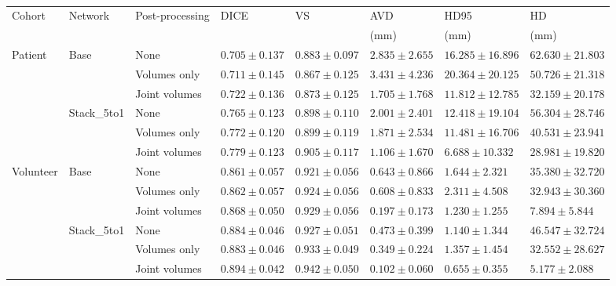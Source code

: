 \begin{sidewaystable}[htbp]
   \centering
   \caption[Detailed Results for Post-processing]{}
   \begin{tabular}{l*{7}{l}}
      \toprule
      Cohort	& Network	& Post-processing	& DICE				& VS				& AVD				& HD95				& HD				\\
      			&					&					&					&					& (mm)				& (mm)				& (mm)				\\
      \midrule
      Patient   & Base 	& None & $0.705 \pm 0.137$ & $\mathbf{0.883 \pm 0.097}$ & $2.835 \pm 2.655$ & $16.285 \pm 16.896$ & $62.630 \pm 21.803$ \\
                &                	& Volumes only  & $0.711 \pm 0.145$ & $0.867 \pm 0.125$ & $3.431 \pm 4.236$ & $20.364 \pm 20.125$ & $50.726 \pm 21.318$ \\
                &                	& Joint volumes & $\mathbf{0.722 \pm 0.136}$ & $0.873 \pm 0.125$ & $\mathbf{1.705 \pm 1.768}$ & $\mathbf{11.812 \pm 12.785}$& $\mathbf{32.159 \pm 20.178}$ \\
      \cmidrule{2-8}
                & Stack\_5to1 	& None & $0.765 \pm 0.123$ & $0.898 \pm 0.110$ & $2.001 \pm 2.401$ & $12.418 \pm 19.104$ & $56.304 \pm 28.746$ \\
                &                	& Volumes only  & $0.772 \pm 0.120$ & $0.899 \pm 0.119$ & $1.871 \pm 2.534$ & $11.481 \pm 16.706$ & $40.531 \pm 23.941$ \\
                &                	& Joint volumes      & $\mathbf{0.779 \pm 0.123}$ & $\mathbf{0.905 \pm 0.117}$ & $\mathbf{1.106 \pm 1.670}$ & $\mathbf{6.688  \pm 10.332}$ & $\mathbf{28.981 \pm 19.820}$ \\
      \midrule
      Volunteer & Base 	& None & $0.861 \pm 0.057$ & $0.921 \pm 0.056$ & $0.643 \pm 0.866$ & $1.644  \pm 2.321 $ & $35.380 \pm 32.720$ \\
                &                	& Volumes only  & $0.862 \pm 0.057$ & $0.924 \pm 0.056$ & $0.608 \pm 0.833$ & $2.311  \pm 4.508 $ & $32.943 \pm 30.360$ \\
                &                	& Joint volumes      & $\mathbf{0.868 \pm 0.050}$ & $\mathbf{0.929 \pm 0.056}$ & $\mathbf{0.197 \pm 0.173}$ & $\mathbf{1.230  \pm 1.255}$ & $\mathbf{7.894  \pm 5.844}$ \\
      \cmidrule{2-8}
                & Stack\_5to1 	& None & $0.884 \pm 0.046$ & $0.927 \pm 0.051$ & $0.473 \pm 0.399$ & $1.140  \pm 1.344 $ & $46.547 \pm 32.724$ \\
                &                	& Volumes only  & $0.883 \pm 0.046$ & $0.933 \pm 0.049$ & $0.349 \pm 0.224$ & $1.357  \pm 1.454 $ & $32.552 \pm 28.627$ \\
                &                	& Joint volumes      & $\mathbf{0.894 \pm 0.042}$ & $\mathbf{0.942 \pm 0.050}$ & $\mathbf{0.102 \pm 0.060}$ & $\mathbf{0.655  \pm 0.355}$ & $\mathbf{5.177  \pm 2.088}$ \\
      \bottomrule
   \end{tabular}
   \label{tab:results_pp}
\end{sidewaystable}

